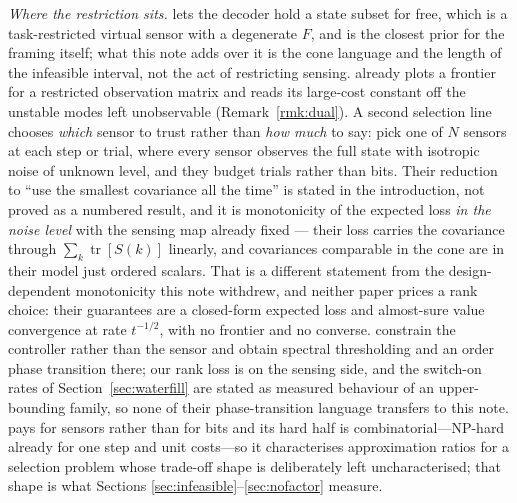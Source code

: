 \documentclass[journal]{IEEEtran}
\theoremstyle{remark}
\begin{document}
\emph{Where the restriction sits.} \cite{cuvelier2021side} lets the decoder hold a
state subset for free, which is a task-restricted virtual sensor with a degenerate
$F$, and is the closest prior for the framing itself; what this note adds over it
is the cone language and the length of the infeasible interval, not the act of
restricting sensing. \cite{sabag2021reducing} already plots a frontier for a
restricted observation matrix and reads its large-cost constant off the unstable
modes left unobservable (Remark~\ref{rmk:dual}). A second selection line chooses
\emph{which} sensor to trust rather than \emph{how much} to say:
\cite{li2023learning,li2026oss} pick one of $N$ sensors at each step or trial, where
every sensor observes the full state with isotropic noise of unknown level, and they
budget trials rather than bits. Their reduction to ``use the smallest covariance all
the time'' is stated in the introduction, not proved as a numbered result, and it is
monotonicity of the expected loss \emph{in the noise level} with the sensing map
already fixed --- their loss carries the covariance through
$\sum_k\operatorname{tr}[S(k)]$ linearly, and covariances comparable in the cone are
in their model just ordered scalars. That is a different statement from the
design-dependent monotonicity this note withdrew, and neither paper prices a rank
choice: their guarantees are a closed-form expected loss and almost-sure value
convergence at rate $t^{-1/2}$, with no frontier and no converse.
\cite{fox2016a,fox2016b} constrain
the controller rather than the sensor and obtain spectral thresholding and an order
phase transition there; our rank loss is on the sensing side, and the switch-on
rates of Section~\ref{sec:waterfill} are stated as measured behaviour of an
upper-bounding family, so none of their phase-transition language transfers to this
note. \cite{tzoumas2020co} pays for sensors rather than for bits and its hard half
is combinatorial---NP-hard already for one step and unit costs---so it
characterises approximation ratios for a selection problem whose trade-off shape is
deliberately left uncharacterised; that shape is what Sections
\ref{sec:infeasible}--\ref{sec:nofactor} measure.
\end{document}
